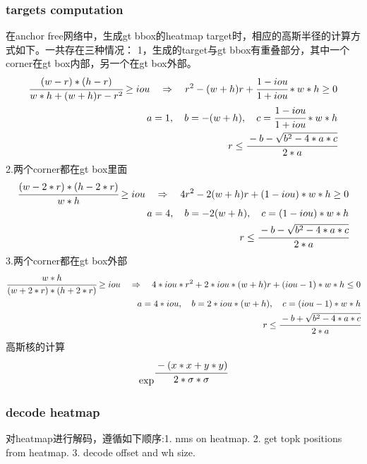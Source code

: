 \documentclass{article}
\begin{document}
\subsubsection{targets computation}
在anchor free网络中，生成gt bbox的heatmap target时，相应的高斯半径的计算方式如下。一共存在三种情况：
1，生成的target与gt bbox有重叠部分，其中一个corner在gt box内部，另一个在gt box外部。
\begin{align}
        \cfrac{(w-r)*(h-r)}{w*h+(w+h)r-r^2} \ge {iou} \quad\Rightarrow\quad
        {r^2-(w+h)r+\cfrac{1-iou}{1+iou}*w*h} \ge 0 \\
        {a} = 1,\quad{b} = {-(w+h)},\quad{c} = {\cfrac{1-iou}{1+iou}*w*h} \\
        {r} \le \cfrac{-b-\sqrt{b^2-4*a*c}}{2*a}
\end{align}
2.两个corner都在gt box里面
\begin{align}
\cfrac{(w-2*r)*(h-2*r)}{w*h} \ge {iou} \quad\Rightarrow\quad
        {4r^2-2(w+h)r+(1-iou)*w*h} \ge 0 \\
        {a} = 4,\quad {b} = {-2(w+h)},\quad {c} = {(1-iou)*w*h} \\
        {r} \le \cfrac{-b-\sqrt{b^2-4*a*c}}{2*a}
\end{align}
3.两个corner都在gt box外部
\begin{align}
\cfrac{w*h}{(w+2*r)*(h+2*r)} \ge {iou} \quad\Rightarrow\quad
        {4*iou*r^2+2*iou*(w+h)r+(iou-1)*w*h} \le 0 \\
        {a} = {4*iou},\quad {b} = {2*iou*(w+h)},\quad {c} = {(iou-1)*w*h} \\
        {r} \le \cfrac{-b+\sqrt{b^2-4*a*c}}{2*a}
\end{align}
高斯核的计算
\begin{align}
\exp^{\cfrac{-(x*x+y*y)}{2*\sigma*\sigma}}
\end{align}

\subsubsection{decode heatmap}
对heatmap进行解码，遵循如下顺序:1. nms on heatmap. 2. get topk positions from heatmap. 3. decode offset and wh size.
\end{document}
